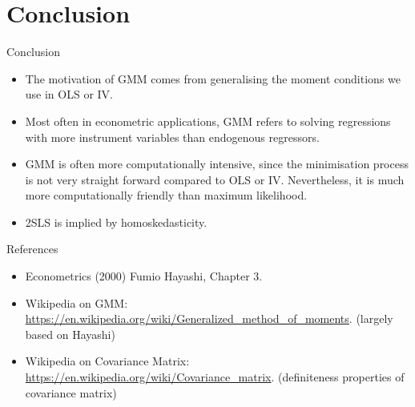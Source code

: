\documentclass{beamer}
\begin{document}
\section{Conclusion}

\begin{frame}{Conclusion}
	\begin{itemize}
		\item
			The motivation of GMM comes from generalising the moment conditions
			we use in OLS or IV.
		\item
			Most often in econometric applications, GMM refers to solving
			regressions with more instrument variables than endogenous regressors.
		\item
			GMM is often more computationally intensive, since the minimisation
			process is not very straight forward compared to OLS or IV.
			Nevertheless, it is much more computationally friendly than maximum likelihood.
		\item
			2SLS is implied by homoskedasticity.
	\end{itemize}
\end{frame}

\begin{frame}{References}
	\begin{itemize}
		\item Econometrics (2000) Fumio Hayashi, Chapter 3.
		\item Wikipedia on GMM: \url{https://en.wikipedia.org/wiki/Generalized_method_of_moments}. (largely based on Hayashi)
		\item Wikipedia on Covariance Matrix: \url{https://en.wikipedia.org/wiki/Covariance_matrix}. (definiteness properties of covariance matrix)
	\end{itemize}
\end{frame}
\end{document}

